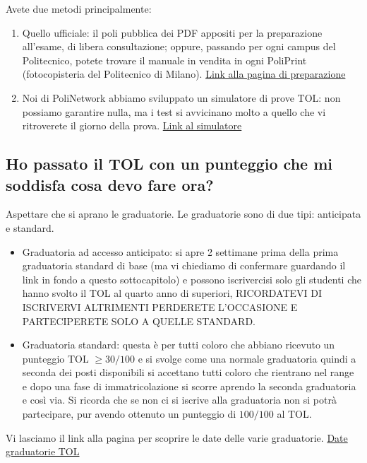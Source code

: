 \documentclass[legal]{polinetwork}
\begin{document}
Avete due metodi principalmente:

\begin{enumerate}
  \item Quello ufficiale: il poli pubblica dei PDF appositi per la preparazione all'esame, di libera consultazione; oppure, passando per ogni campus del Politecnico, potete trovare il manuale in vendita in ogni PoliPrint (fotocopisteria del Politecnico di Milano). \href{https://www.polimi.it/futuri-studenti/test-e-ammissione/laurea/ingegneria/in-cosa-consiste-il-tol-e-come-prepararsi}{Link alla pagina di preparazione}
  \item Noi di PoliNetwork abbiamo sviluppato un simulatore di prove TOL: non possiamo garantire nulla, ma i test si avvicinano molto a quello che vi ritroverete il giorno della prova. \href{https://tol.polinetwork.org/}{Link al simulatore}
\end{enumerate}


\subsection{Ho passato il TOL con un punteggio che mi soddisfa cosa devo fare ora?}


Aspettare che si aprano le graduatorie. Le graduatorie sono di due tipi: anticipata e standard.

\begin{itemize}
  \item Graduatoria ad accesso anticipato: si apre 2 settimane prima della prima graduatoria standard di base (ma vi chiediamo di confermare guardando il link in fondo a questo sottocapitolo) e possono iscrivercisi solo gli studenti che hanno svolto il TOL al quarto anno di superiori, RICORDATEVI DI ISCRIVERVI ALTRIMENTI PERDERETE L'OCCASIONE E PARTECIPERETE SOLO A QUELLE STANDARD.
  \item Graduatoria standard: questa è per tutti coloro che abbiano ricevuto un punteggio TOL $\geq 30/100$ e si svolge come una normale graduatoria quindi a seconda dei posti disponibili si accettano tutti coloro che rientrano nel range e dopo una fase di immatricolazione si scorre aprendo la seconda graduatoria e così via. Si ricorda che se non ci si iscrive alla graduatoria non si potrà partecipare, pur avendo ottenuto un punteggio di $100/100$ al TOL.
\end{itemize}


Vi lasciamo il link alla pagina per scoprire le date delle varie graduatorie. \href{https://www.polimi.it/futuri-studenti/test-e-ammissione/laurea/ingegneria/punteggi-e-formulazione-delle-graduatorie}{Date graduatorie TOL}
\end{document}
